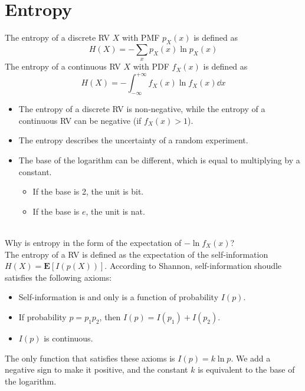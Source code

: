 \documentclass[device=normal, lang=en]{elegantbook}
\numberwithin{equation}{section}
\begin{document}
\section{Entropy}
\begin{definition}[Entropy]
    The entropy of a discrete RV $X$ with PMF $p_X(x)$ is defined as
    \begin{equation}
        H(X) = -\sum_{x} p_X(x) \ln p_X(x)
    \end{equation}
    The entropy of a continuous RV $X$ with PDF $f_X(x)$ is defined as
    \begin{equation}
        H(X) = -\int_{-\infty}^{+\infty} f_X(x) \ln f_X(x) \dd{x}
    \end{equation}
\end{definition}
\begin{remark}
    \begin{itemize}
        \item The entropy of a discrete RV is non-negative, while the entropy of a continuous RV can be negative (if $f_{X}(x) > 1$).
        \item The entropy describes the uncertainty of a random experiment.
        \item The base of the logarithm can be different, which is equal to multiplying by a constant. \begin{itemize}
            \item If the base is 2, the unit is bit.
            \item If the base is $e$, the unit is nat.
        \end{itemize}
    \end{itemize}
\end{remark}
\begin{remark} \\ 
    Why is entropy in the form of the expectation of $-\ln f_{X}(x)$? \\ 
    The entropy of a RV is defined as the expectation of the self-information $H(X) = \mathbf{E}[I(p(X))]$. According to Shannon, self-information shoudle satisfies the following axioms:
    \begin{itemize}
        \item Self-information is and only is a function of probability $I(p)$.
        \item If probability $p = p_1 p_2$, then $I(p) = I(p_1) + I(p_2)$.
        \item $I(p)$ is continuous.
    \end{itemize}
    The only function that satisfies these axioms is $I(p) = k \ln p$. We add a negative sign to make it positive, and the constant $k$ is equivalent to the base of the logarithm. 
\end{remark}



\appendix

\end{document}
